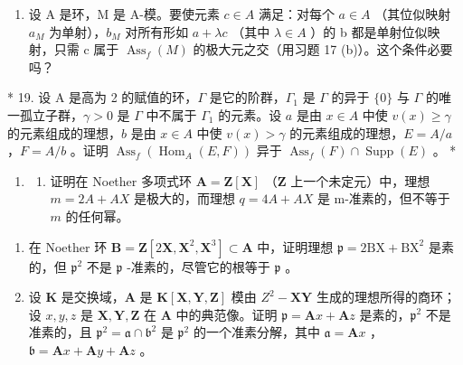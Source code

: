 \begin{enumerate}
\def\labelenumi{\arabic{enumi}.}
\setcounter{enumi}{17}
\tightlist
\item
  设 A 是环，M 是 A-模。要使元素 \(c \in A\) 满足：对每个 \(a \in A\) （其位似映射 \(a_{M}\) 为单射），\(b_{M}\) 对所有形如 \(a + \lambda c\) （其中 \(\lambda \in A\) ）的 b 都是单射位似映射，只需 c 属于 \(\operatorname{Ass}_{f}(M)\) 的极大元之交（用习题 17 (b)）。这个条件必要吗？
\end{enumerate}

* 19. 设 A 是高为 2 的赋值的环，\(\Gamma\) 是它的阶群，\(\Gamma_1\) 是 \(\Gamma\) 的异于 \(\{0\}\) 与 \(\Gamma\) 的唯一孤立子群，\(\gamma > 0\) 是 \(\Gamma\) 中不属于 \(\Gamma_1\) 的元素。设 \(a\) 是由 \(x \in A\) 中使 \(v(x) \geqslant \gamma\) 的元素组成的理想，\(b\) 是由 \(x \in A\) 中使 \(v(x) > \gamma\) 的元素组成的理想，\(E = A/a\) ，\(F = A/b\) 。证明 \(\operatorname{Ass}_f(\operatorname{Hom}_A(E, F))\) 异于 \(\operatorname{Ass}_f(F) \cap \operatorname{Supp}(E)\) 。 *


\begin{enumerate}
\def\labelenumi{\arabic{enumi}.}
\tightlist
\item
  \begin{enumerate}
  \def\labelenumii{(\alph{enumii})}
  \tightlist
  \item
    证明在 Noether 多项式环 \(\mathbf{A} = \mathbf{Z}[\mathbf{X}]\) （\(\mathbf{Z}\) 上一个未定元）中，理想 \(m = 2A + AX\) 是极大的，而理想 \(q = 4A + AX\) 是 m-准素的，但不等于 \(m\) 的任何幂。
  \end{enumerate}
\end{enumerate}

\begin{enumerate}
\def\labelenumi{(\alph{enumi})}
\setcounter{enumi}{1}
\item
  在 Noether 环 \(\mathbf{B} = \mathbf{Z}[2\mathbf{X},\mathbf{X}^2,\mathbf{X}^3] \subset \mathbf{A}\) 中，证明理想 \(\mathfrak{p} = 2\mathrm{BX} + \mathrm{BX}^2\) 是素的，但 \(\mathfrak{p}^2\) 不是 \(\mathfrak{p}\) -准素的，尽管它的根等于 \(\mathfrak{p}\) 。
\item
  设 \(\mathbf{K}\) 是交换域，\(\mathbf{A}\) 是 \(\mathbf{K}[\mathbf{X},\mathbf{Y},\mathbf{Z}]\) 模由 \(Z^2 -\mathbf{XY}\) 生成的理想所得的商环；设 \(x,y,z\) 是 \(\mathbf{X},\mathbf{Y},\mathbf{Z}\) 在 \(\mathbf{A}\) 中的典范像。证明 \(\mathfrak{p} = \mathbf{A}x + \mathbf{A}z\) 是素的，\(\mathfrak{p}^2\) 不是准素的，且 \(\mathfrak{p}^2 = \mathfrak{a}\cap \mathfrak{b}^2\) 是 \(\mathfrak{p}^2\) 的一个准素分解，其中 \(\mathfrak{a} = \mathbf{A}x\) ，\(\mathfrak{b} = \mathbf{A}x + \mathbf{A}y + \mathbf{A}z\) 。
\end{enumerate}

